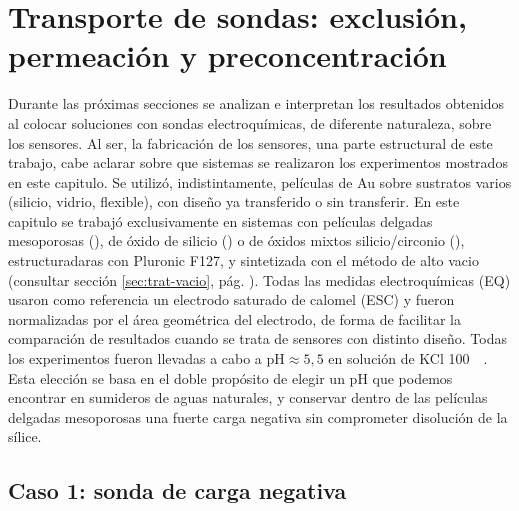 				

\section{Transporte de sondas: exclusión, permeación y preconcentración}

	 Durante las próximas secciones se analizan e interpretan los resultados obtenidos al colocar soluciones con sondas electroquímicas, de diferente naturaleza, sobre los sensores. Al ser, la fabricación de los sensores, una parte estructural de este trabajo, cabe aclarar sobre que sistemas se realizaron los experimentos mostrados en este capitulo. Se utilizó, indistintamente, películas de Au sobre sustratos varios (silicio, vidrio, flexible), con diseño ya transferido o sin transferir. En este capitulo se trabajó exclusivamente en sistemas con películas delgadas mesoporosas (\pdm), de óxido de silicio (\pdmF) o de óxidos mixtos silicio/circonio (\pdmZ), estructuradaras con Pluronic F127, y sintetizada con el método de alto vacio (consultar sección \ref{sec:trat-vacio}, pág. \pageref{sec:trat-vacio}). Todas las medidas electroquímicas (EQ) usaron como referencia un electrodo saturado de calomel (ESC) y fueron normalizadas por el área geométrica del electrodo, de forma de facilitar la comparación de resultados cuando se trata de sensores con distinto diseño. Todas los experimentos fueron llevadas a cabo a $\text{pH}\approx5,5$ en solución de KCl \SI{100}{\milli\Molar}. Esta elección se basa en el doble propósito de elegir un pH que podemos encontrar en sumideros de aguas naturales, y conservar dentro de las películas delgadas mesoporosas una fuerte carga negativa sin comprometer disolución de la sílice.

	\subsection{Caso 1: sonda de carga negativa}

